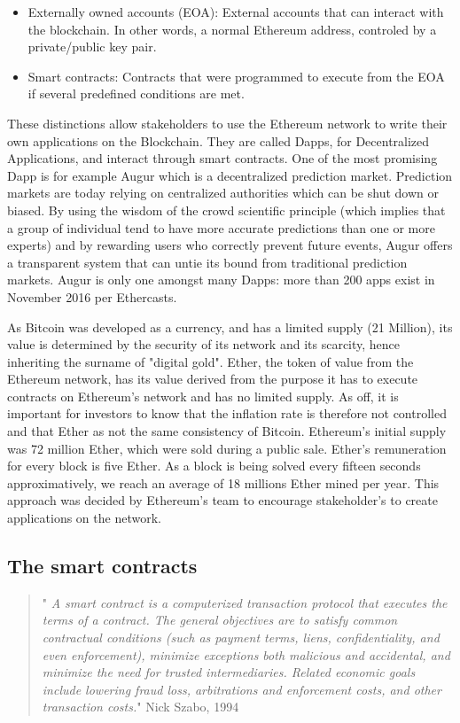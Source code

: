 \documentclass[11pt]{report}
\begin{document}
\begin{itemize}
\item Externally owned accounts (EOA): External accounts that can interact with the blockchain. In other words, a normal Ethereum address, controled by a private/public key pair.
\item Smart contracts: Contracts that were programmed to execute from the EOA if several predefined conditions are met.
\end{itemize}

These distinctions allow stakeholders to use the Ethereum network to write their own applications on the Blockchain. They are called Dapps, for Decentralized Applications, and interact through smart contracts.\newline
One of the most promising Dapp is for example Augur \cite{AUGUR} which is a decentralized prediction market. Prediction markets are today relying on centralized authorities which can be shut down or biased. By using the wisdom of the crowd \cite{SUROWIECKI} scientific principle (which implies that a group of individual tend to have more accurate predictions than one or more experts) and by rewarding users who correctly prevent future events, Augur offers a transparent system that can untie its bound from traditional prediction markets. Augur is only one amongst many Dapps: more than 200 apps exist in November 2016 per Ethercasts.\cite{ETHERCASTS} \medbreak

As Bitcoin was developed as a currency, and has a limited supply (21 Million), its value is determined by the security of its network and its scarcity, hence inheriting the surname of "digital gold". \newline 
Ether, the token of value from the Ethereum network, has its value derived from the purpose it has to execute contracts on Ethereum's network and has no limited supply. As off, it is important for investors to know that the inflation rate is therefore not controlled and that Ether as not the same consistency of Bitcoin. Ethereum's initial supply was 72 million Ether, which were sold during a public sale. Ether's remuneration for every block is five Ether. As a block is being solved every fifteen seconds approximatively, we reach an average of 18 millions Ether mined per year. This approach was decided by Ethereum's team to encourage stakeholder's to create applications on the network. \newline
\clearpage
\subsection*{The smart contracts}
\begin{quote} "\textit{
A smart contract is a computerized transaction protocol that executes the terms of a contract. The general objectives are to satisfy common contractual conditions (such as payment terms, liens, confidentiality, and even enforcement), minimize exceptions both malicious and accidental, and minimize the need for trusted intermediaries. Related economic goals include lowering fraud loss, arbitrations and enforcement costs, and other transaction costs.}" \newline
Nick Szabo, 1994\cite{Szabo}
\end{quote}
\end{document}

